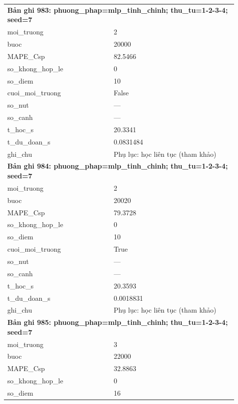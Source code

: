 \begin{longtable}{p{0.43\linewidth}p{0.50\linewidth}}
\midrule
\multicolumn{2}{p{0.95\linewidth}}{\textbf{Bản ghi 983: phuong\_phap=mlp\_tinh\_chinh; thu\_tu=1-2-3-4; seed=7}} \\
moi\_\allowbreak truong & 2 \\
buoc & 20000 \\
MAPE\_\allowbreak Csp & 82.5466 \\
so\_\allowbreak khong\_\allowbreak hop\_\allowbreak le & 0 \\
so\_\allowbreak diem & 10 \\
cuoi\_\allowbreak moi\_\allowbreak truong & False \\
so\_\allowbreak nut & — \\
so\_\allowbreak canh & — \\
t\_\allowbreak hoc\_\allowbreak s & 20.3341 \\
t\_\allowbreak du\_\allowbreak doan\_\allowbreak s & 0.0831484 \\
ghi\_\allowbreak chu & Phụ lục: học liên tục (tham khảo) \\
\midrule
\multicolumn{2}{p{0.95\linewidth}}{\textbf{Bản ghi 984: phuong\_phap=mlp\_tinh\_chinh; thu\_tu=1-2-3-4; seed=7}} \\
moi\_\allowbreak truong & 2 \\
buoc & 20020 \\
MAPE\_\allowbreak Csp & 79.3728 \\
so\_\allowbreak khong\_\allowbreak hop\_\allowbreak le & 0 \\
so\_\allowbreak diem & 10 \\
cuoi\_\allowbreak moi\_\allowbreak truong & True \\
so\_\allowbreak nut & — \\
so\_\allowbreak canh & — \\
t\_\allowbreak hoc\_\allowbreak s & 20.3593 \\
t\_\allowbreak du\_\allowbreak doan\_\allowbreak s & 0.0018831 \\
ghi\_\allowbreak chu & Phụ lục: học liên tục (tham khảo) \\
\midrule
\multicolumn{2}{p{0.95\linewidth}}{\textbf{Bản ghi 985: phuong\_phap=mlp\_tinh\_chinh; thu\_tu=1-2-3-4; seed=7}} \\
moi\_\allowbreak truong & 3 \\
buoc & 22000 \\
MAPE\_\allowbreak Csp & 32.8863 \\
so\_\allowbreak khong\_\allowbreak hop\_\allowbreak le & 0 \\
so\_\allowbreak diem & 16 \\

\end{longtable}
